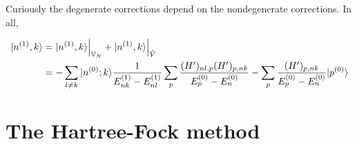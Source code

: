 Curiously the degenerate corrections depend on the nondegenerate corrections. In all, 
\begin{thrm}
\begin{equation}
\begin{aligned}
|n^{(1)},k\rangle&=|n^{(1)},k\rangle\Big|_{\mathbb{V}_N}+|n^{(1)},k\rangle\Big|_{\hat{V}}\\
&=-\sum_{l\neq k}|n^{(0)};k\rangle\frac{1}{E_{nk}^{(1)}-E_{nl}^{(1)}}\sum_p\frac{(H')_{nl,p}(H')_{p,nk}}{E_p^{(0)}-E_n^{(0)}}-\sum_p\frac{(H')_{p,nk}}{E_p^{(0)}-E_n^{(0)}}|p^{(0)}\rangle
\end{aligned}
\end{equation}
\end{thrm}
\section{The Hartree-Fock method}
